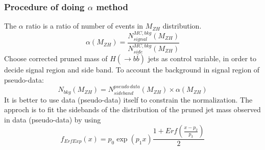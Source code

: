 \documentclass[aspectratio=169]{beamer}
\begin{document}
\begin{frame}
  \frametitle{Procedure of doing $\alpha$ method}
  \justifying
  \begin{footnotesize}
    The $\alpha$ ratio is a ratio of number of events in $M_{ZH}$ distribution.
    \begin{equation}
      \alpha(M_{ZH}) = \frac{N^{MC,bkg}_{signal}(M_{ZH})}{N^{MC,bkg}_{side}(M_{ZH})}
    \end{equation}
    Choose corrected pruned mass of $H (\rightarrow b\bar{b})$ jets as control variable, in order to decide signal region and side band.
    To account the background in signal region of pseudo-data:
    \begin{equation}
      N_{bkg}(M_{ZH}) = N^{pseudo\ data}_{sideband}(M_{ZH})\times \alpha(M_{ZH})
    \end{equation}
    It is better to use data (pseudo-data) itself to constrain the normalization.
    The approch is to fit the sidebands of the distribution of the pruned jet mass observed in data (pseudo-data) by using
    \begin{equation}
      f_{ErfExp}(x) = p_0\exp(p_1x)\frac{1+Erf(\frac{x-p_2}{p_3})}{2}
    \end{equation}
  \end{footnotesize}
\end{frame}
\renewcommand{\arraystretch}{1.1}
\end{document}
